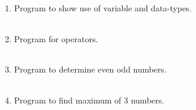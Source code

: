 \documentclass{exam}
\begin{document}
  \begin{enumerate}
   \item Program to show  use of variable and data-types.

   \begin{myTableStyle}
   \begin{center} \begin{tabular}{ |m{16cm}| } \hline
              \\ \hline
    \end{tabular} \end{center}
  \end{myTableStyle}
  \pagebreak

   \item  Program for  operators.

   \begin{myTableStyle}
   \begin{center} \begin{tabular}{ |m{14cm}| } \hline
              \\ \hline
    \end{tabular} \end{center}
\end{myTableStyle}
  \pagebreak
  \pagebreak

   \item  Program to determine even odd numbers.

   \begin{myTableStyle}
   \begin{center} \begin{tabular}{ |m{14cm}| } \hline
              \\ \hline
    \end{tabular} \end{center}
\end{myTableStyle}
  \pagebreak

   \item  Program to find maximum of 3  numbers.

   \begin{myTableStyle}
   \begin{center} \begin{tabular}{ |m{14cm}| } \hline
              \\ \hline
    \end{tabular} \end{center}
\end{myTableStyle}
  \pagebreak


\end{enumerate}
\end{document}
